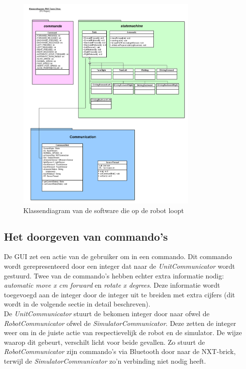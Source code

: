 \documentclass[tt3]{penoverslag}
\begin{document}
\begin{figure}[tbp]
\begin{center}
    \includegraphics[width=0.8\textwidth]{KlassendiagramNXT}
    \caption{Klassendiagram van de software die op de robot loopt}
	\label{fig:klasDiaNXT}
\end{center}
\end{figure}

\subsection{Het doorgeven van commando's} %
\label{ssec:commands}
De GUI zet een actie van de gebruiker om in een commando. Dit commando wordt gerepresenteerd door een integer dat naar de \textit{UnitCommunicator} wordt gestuurd. Twee van de commando's hebben echter extra informatie nodig: \textit{automatic move x cm forward} en \textit{rotate x degrees}. Deze informatie wordt toegevoegd aan de integer door de integer uit te breiden met extra cijfers (dit wordt in de volgende sectie in detail beschreven).\\
De \textit{UnitCommunicator} stuurt de bekomen integer door naar ofwel de \textit{RobotCommunicator} ofwel de \textit{SimulatorCommunicator}. Deze zetten de integer weer om in de juiste actie van respectievelijk de robot en de simulator. De wijze waarop dit gebeurt, verschilt licht voor beide gevallen. Zo stuurt de \textit{RobotCommunicator} zijn commando's via Bluetooth door naar de NXT-brick, terwijl de \textit{SimulatorCommunicator} zo'n verbinding niet nodig heeft.\\
\end{document}
